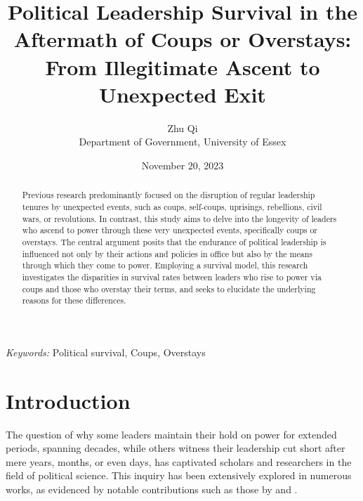 \documentclass[
  12pt,
  a4paper,
  12pt]{article}
\begin{document}
\def\spacingset#1{\renewcommand{\baselinestretch}%
{#1}\small\normalsize} \spacingset{1}



\date{November 20, 2023}
\title{\bf Political Leadership Survival in the Aftermath of Coups or
Overstays: From Illegitimate Ascent to Unexpected Exit}
\author{
Zhu Qi\\
Department of Government, University of Essex\\
}
\maketitle

\bigskip
\bigskip
\begin{abstract}
Previous research predominantly focused on the disruption of regular
leadership tenures by unexpected events, such as coups, self-coups,
uprisings, rebellions, civil wars, or revolutions. In contrast, this
study aims to delve into the longevity of leaders who ascend to power
through these very unexpected events, specifically coups or overstays.
The central argument posits that the endurance of political leadership
is influenced not only by their actions and policies in office but also
by the means through which they come to power. Employing a survival
model, this research investigates the disparities in survival rates
between leaders who rise to power via coups and those who overstay their
terms, and seeks to elucidate the underlying reasons for these
differences.
\end{abstract}

\noindent%
{\it Keywords:} Political survival, Coups, Overstays
\vfill

\newpage
\spacingset{1.9} %
\ifdefined\Shaded\renewenvironment{Shaded}{\begin{tcolorbox}[sharp corners, breakable, boxrule=0pt, interior hidden, borderline west={3pt}{0pt}{shadecolor}, frame hidden, enhanced]}{\end{tcolorbox}}\fi

\hypertarget{introduction}{%
\section{Introduction}\label{introduction}}

The question of why some leaders maintain their hold on power for
extended periods, spanning decades, while others witness their
leadership cut short after mere years, months, or even days, has
captivated scholars and researchers in the field of political science.
This inquiry has been extensively explored in numerous works, as
evidenced by notable contributions such as those by
\citet{clinton1975politics} and \citet{buenodemesquita2003}.
\end{document}
